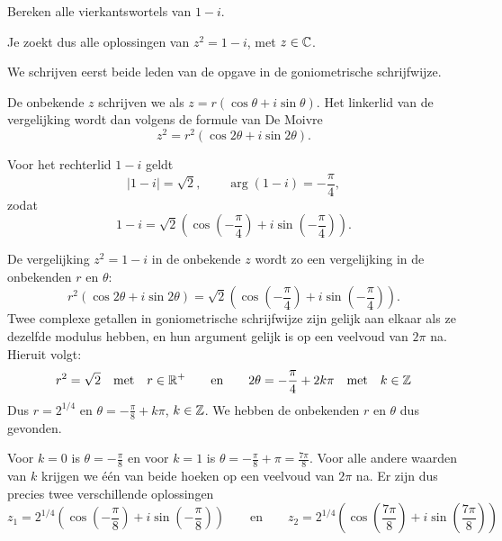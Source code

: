 \documentclass{ximera}
\begin{document}
\begin{example} Bereken alle vierkantswortels van $1-i$.
    \begin{hint}
    Je zoekt dus alle oplossingen van $z^2 = 1 - i$, met $z \in \mathbb{C}$.
    \end{hint}
    \begin{oplossing}
        We schrijven eerst beide leden van de opgave in de goniometrische schrijfwijze.
         
        De onbekende $z$ schrijven we als $z = r(\cos\theta+i\sin\theta)$. Het linkerlid van de vergelijking wordt dan volgens de formule van De Moivre $$z^2 = r^2 (\cos 2\theta+i\sin 2\theta).$$
         
        Voor het rechterlid $1-i$ geldt
        \[ |1-i| = \sqrt{2}, \qquad \arg (1-i) = - \frac{\pi}{4}, \]
        zodat
        \[ 1-i = \sqrt{2}( \cos(-\frac{\pi}{4}) + i \sin(-\frac{\pi}{4})). \]
         
        De
        vergelijking $z^2 = 1-i$ in de onbekende $z$ wordt zo een vergelijking in de onbekenden $r$ en $\theta$:
        $$r^2 (\cos 2\theta+i\sin 2\theta) = \sqrt{2} ( \cos(-\frac{\pi}{4}) + i \sin(-\frac{\pi}{4})).$$
        Twee complexe getallen in goniometrische schrijfwijze zijn gelijk aan elkaar als ze dezelfde modulus hebben, en hun argument gelijk is op een veelvoud van $2 \pi$ na.
        Hieruit volgt:
        \[ r^2 = \sqrt{2} \quad \text{met} \quad r\in \mathbb{R}^+ \qquad \text{en} \qquad 2 \theta = - \frac{\pi}{4} + 2 k \pi \quad \text{met} \quad k\in \mathbb{Z}\]
        Dus $r= 2^{1/4}$ en $\theta = - \frac{\pi}{8} + k \pi$, $k \in \mathbb{Z}$. We hebben de onbekenden $r$ en $\theta$ dus gevonden.
         
         Voor $k=0$ is
        $\theta = - \frac{\pi}{8}$ en voor $k=1$ is $\theta = -
        \frac{\pi}{8} + \pi = \frac{7\pi}{8}$. Voor alle andere waarden van $k$ krijgen we één van beide hoeken op een veelvoud van $2 \pi$ na. 
        Er zijn dus precies twee verschillende oplossingen
        \[ 
            z_1 = 2^{1/4}\left( \cos\left(-\frac{\pi}{8}\right) + i \sin\left(-\frac{\pi}{8}\right)\right)  \qquad \text{en} \qquad
            z_2 = 2^{1/4}\left( \cos\left(\frac{7\pi}{8}\right) + i \sin\left(\frac{7\pi}{8}\right)\right)  
        \]
         
    \end{oplossing}
\end{example}
 
\end{document}
